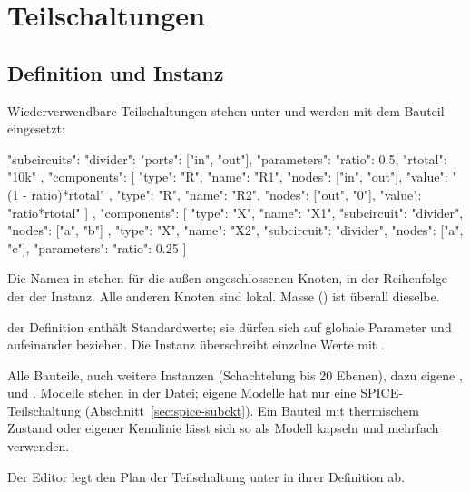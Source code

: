 \chapter{Teilschaltungen}
\label{kap:format-teilschaltungen}

\section{Definition und Instanz}

Wiederverwendbare Teilschaltungen stehen unter  und
werden mit dem Bauteil  eingesetzt:

\begin{json}
"subcircuits": {
  "divider": {
    "ports": ["in", "out"],
    "parameters": { "ratio": 0.5, "rtotal": "10k" },
    "components": [
      { "type": "R", "name": "R1", "nodes": ["in", "out"], "value": "(1 - ratio)*rtotal" },
      { "type": "R", "name": "R2", "nodes": ["out", "0"],  "value": "ratio*rtotal" }
    ]
  }
},
"components": [
  { "type": "X", "name": "X1", "subcircuit": "divider", "nodes": ["a", "b"] },
  { "type": "X", "name": "X2", "subcircuit": "divider", "nodes": ["a", "c"],
    "parameters": { "ratio": 0.25 } }
]
\end{json}

\begin{description}[style=nextline,leftmargin=2em]
  \item[Knoten]
    Die Namen in  stehen für die außen angeschlossenen Knoten,
    in der Reihenfolge der  der Instanz. Alle anderen Knoten
    sind lokal. Masse () ist überall dieselbe.
  \item[Parameter]
     der Definition enthält Standardwerte; sie dürfen sich
    auf globale Parameter und aufeinander beziehen. Die Instanz
    überschreibt einzelne Werte mit .
  \item[Inhalt]
    Alle Bauteile, auch weitere Instanzen (Schachtelung bis 20 Ebenen),
    dazu eigene ,  und .
    Modelle stehen in  der Datei; eigene Modelle hat nur eine
    SPICE-Teilschaltung (Abschnitt~\ref{sec:spice-subckt}). Ein Bauteil mit thermischem Zustand oder eigener
    Kennlinie lässt sich so als Modell kapseln und mehrfach verwenden.
  \item[Plan]
    Der Editor legt den Plan der Teilschaltung unter  in
    ihrer Definition ab.
\end{description}


